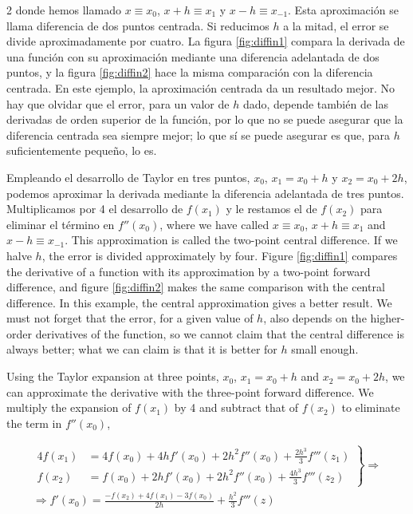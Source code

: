 \begin{paracol}{2}
donde hemos llamado $x\equiv x_0$, $x+h\equiv x_1$ y $x-h\equiv x_{-1}$. Esta aproximación se llama diferencia de dos puntos centrada. Si reducimos $h$ a la mitad, el error se divide aproximadamente por cuatro. La figura \ref{fig:diffin1} compara la derivada de una función con su aproximación mediante una diferencia adelantada de dos puntos, y la figura \ref{fig:diffin2} hace la misma comparación con la diferencia centrada. En este ejemplo, la aproximación centrada da un resultado mejor. No hay que olvidar que el error, para un valor de $h$ dado, depende también de las derivadas de orden superior de la función, por lo que no se puede asegurar que la diferencia centrada sea siempre mejor; lo que sí se puede asegurar es que, para $h$ suficientemente pequeño, lo es.

Empleando el desarrollo de Taylor en tres puntos, $x_0$, $x_1=x_0+h$ y $x_2=x_0+2h$, podemos aproximar la derivada mediante la diferencia adelantada de tres puntos. Multiplicamos por 4 el desarrollo de $f(x_1)$ y le restamos el de $f(x_2)$ para eliminar el término en $f''(x_0)$,
\switchcolumn
where we have called $x\equiv x_0$, $x+h\equiv x_1$ and $x-h\equiv x_{-1}$. This approximation is called the two-point central difference. If we halve $h$, the error is divided approximately by four. Figure \ref{fig:diffin1} compares the derivative of a function with its approximation by a two-point forward difference, and figure \ref{fig:diffin2} makes the same comparison with the central difference. In this example, the central approximation gives a better result. We must not forget that the error, for a given value of $h$, also depends on the higher-order derivatives of the function, so we cannot claim that the central difference is always better; what we can claim is that it is better for $h$ small enough.

Using the Taylor expansion at three points, $x_0$, $x_1=x_0+h$ and $x_2=x_0+2h$, we can approximate the derivative with the three-point forward difference. We multiply the expansion of $f(x_1)$ by 4 and subtract that of $f(x_2)$ to eliminate the term in $f''(x_0)$,
\end{paracol}
\begin{gather*}
\left. \begin{aligned}
4f(x_1)&=4f(x_0)+4hf'(x_0)+2h^2f''(x_0)+\frac{2h^3}{3}f'''(z_1)\\
f(x_2)&=f(x_0)+2hf'(x_0)+2h^2f''(x_0)+\frac{4h^3}{3}f'''(z_2)
\end{aligned} \right\rbrace \Rightarrow \\
\Rightarrow f'(x_0)=\frac{-f(x_2)+4f(x_1)-3f(x_0)}{2h}+\frac{h^2}{3}f'''(z)
\end{gather*}
